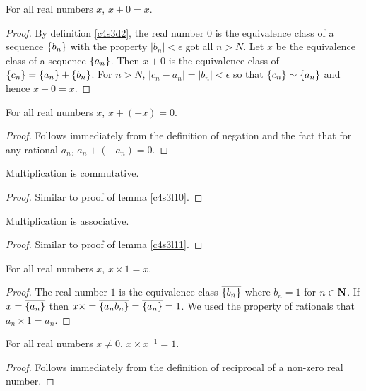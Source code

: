 \begin{lem}\label{c4s3l12}
For all real numbers $x$, $x + 0 = x$.
\end{lem}
\begin{proof}
By definition \ref{c4s3d2}, the real number $0$ is the equivalence class of
a sequence $\{b_n\}$ with the property $|b_n| < \epsilon$ got all $n
> N$. Let $x$ be the equivalence class of a sequence $\{a_n\}$. Then
$x + 0$ is the equivalence class of $\{c_n\} = \{a_n\} + \{b_n\}$. 
For $n > N$, $|c_n - a_n| = |b_n| < \epsilon$ so that $\{c_n\} \sim
\{a_n\}$ and hence $x + 0 = x$.
\end{proof}

\begin{lem}\label{c4s3l13}
For all real numbers $x$, $x + (-x) = 0$.
\end{lem}
\begin{proof}
Follows immediately from the definition of negation and the fact that for
any rational $a_n$, $a_n + (-a_n) = 0$.
\end{proof}

\begin{lem}\label{c4s3l14}
Multiplication is commutative.
\end{lem}
\begin{proof}
Similar to proof of lemma \ref{c4s3l10}.
\end{proof}

\begin{lem}\label{c4s3l15}
Multiplication is associative.
\end{lem}
\begin{proof}
Similar to proof of lemma \ref{c4s3l11}.
\end{proof}

\begin{lem}\label{c4s3l16}
For all real numbers $x$, $x \times 1 = x$.
\end{lem}
\begin{proof}
The real number $1$ is the equivalence class $\overline{\{b_n\}}$
where $b_n = 1$ for $n \in \mathbf{N}$. If $x = \overline{\{a_n\}}$ then $x
\times = \overline{\{a_nb_n\}} = \overline{\{a_n\}} = 1$. We used the
property of rationals that $a_n \times 1 = a_n$.
\end{proof}

\begin{lem}\label{c4s3l17}
For all real numbers $x \ne 0$, $x \times x^{-1} = 1$.
\end{lem}
\begin{proof}
Follows immediately from the definition of reciprocal of a non-zero real
number.
\end{proof}

